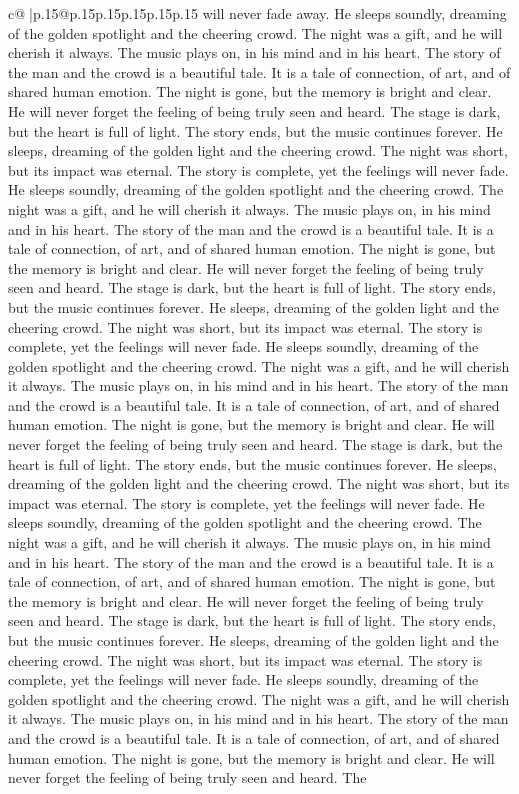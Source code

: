 \documentclass{article}
\begin{document}
{\begin{supertabular}{c@{$\;$}|p{.15\linewidth}@{}p{.15\linewidth}p{.15\linewidth}p{.15\linewidth}p{.15\linewidth}p{.15\linewidth}}
{{{will never fade away. He sleeps soundly, dreaming of the golden spotlight and the cheering crowd. The night was a gift, and he will cherish it always. The music plays on, in his mind and in his heart. The story of the man and the crowd is a beautiful tale. It is a tale of connection, of art, and of shared human emotion. The night is gone, but the memory is bright and clear. He will never forget the feeling of being truly seen and heard. The stage is dark, but the heart is full of light. The story ends, but the music continues forever. He sleeps, dreaming of the golden light and the cheering crowd. The night was short, but its impact was eternal. The story is complete, yet the feelings will never fade. He sleeps soundly, dreaming of the golden spotlight and the cheering crowd. The night was a gift, and he will cherish it always. The music plays on, in his mind and in his heart. The story of the man and the crowd is a beautiful tale. It is a tale of connection, of art, and of shared human emotion. The night is gone, but the memory is bright and clear. He will never forget the feeling of being truly seen and heard. The stage is dark, but the heart is full of light. The story ends, but the music continues forever. He sleeps, dreaming of the golden light and the cheering crowd. The night was short, but its impact was eternal. The story is complete, yet the feelings will never fade. He sleeps soundly, dreaming of the golden spotlight and the cheering crowd. The night was a gift, and he will cherish it always. The music plays on, in his mind and in his heart. The story of the man and the crowd is a beautiful tale. It is a tale of connection, of art, and of shared human emotion. The night is gone, but the memory is bright and clear. He will never forget the feeling of being truly seen and heard. The stage is dark, but the heart is full of light. The story ends, but the music continues forever. He sleeps, dreaming of the golden light and the cheering crowd. The night was short, but its impact was eternal. The story is complete, yet the feelings will never fade. He sleeps soundly, dreaming of the golden spotlight and the cheering crowd. The night was a gift, and he will cherish it always. The music plays on, in his mind and in his heart. The story of the man and the crowd is a beautiful tale. It is a tale of connection, of art, and of shared human emotion. The night is gone, but the memory is bright and clear. He will never forget the feeling of being truly seen and heard. The stage is dark, but the heart is full of light. The story ends, but the music continues forever. He sleeps, dreaming of the golden light and the cheering crowd. The night was short, but its impact was eternal. The story is complete, yet the feelings will never fade. He sleeps soundly, dreaming of the golden spotlight and the cheering crowd. The night was a gift, and he will cherish it always. The music plays on, in his mind and in his heart. The story of the man and the crowd is a beautiful tale. It is a tale of connection, of art, and of shared human emotion. The night is gone, but the memory is bright and clear. He will never forget the feeling of being truly seen and heard. The }}}
\end{supertabular}}
\end{document}
